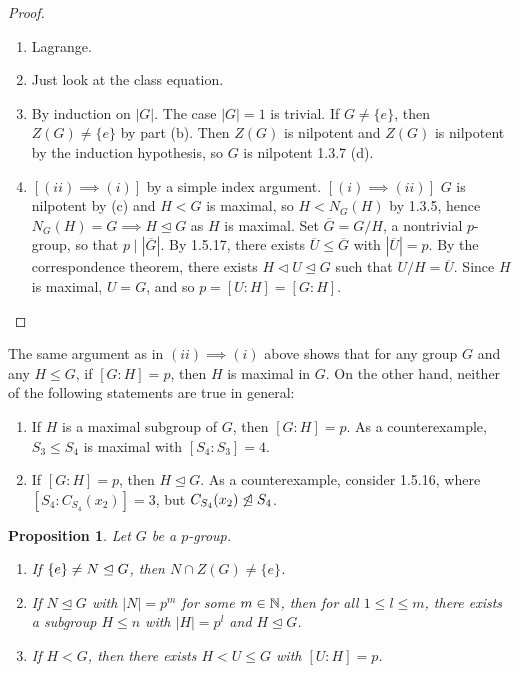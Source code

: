 \documentclass[11pt]{book}
\newcounter{counter}
\newtheorem{proposition}[counter]{Proposition}   \newtheorem{problem}[counter]{Problem}   \newtheorem*{proposition*}{Proposition}   \newtheorem*{lemma*}{Lemma}
\theoremstyle{definition}   \newtheorem{defn}[counter]{Definition} %
\newcommand{\ov}{\overline}   \newcommand{\wt}{\widetilde}
\newcommand{\nsg}{\mathrel{\unlhd}}   \newcommand{\ind}{\parindent24pt}   \newcommand{\vn}{\varnothing}
\newcommand{\tl}{\triangleleft}   \newcommand{\sd}[1]{\rtimes_{#1}}   \newcommand{\x}{^{\times}}   \newcommand{\cyc}[1]{\begin{pmatrix} #1 \end{pmatrix}}
\newcommand{\vs}{\vspace{8pt}}
\numberwithin{counter}{chapter}
\begin{document}
\begin{proof}
\
\begin{enumerate}
\item[(a)] Lagrange.
\item[(b)] Just look at the class equation.
\item[(c)] By induction on $|G|$. The case $|G| = 1$ is trivial. If $G \ne \{e\}$, then $Z(G) \ne \{e\}$ by part (b). Then $Z(G)$ is nilpotent and $Z(G)$ is nilpotent by the induction hypothesis, so $G$ is nilpotent 1.3.7 (d).
\item[(d)] $[(ii) \implies (i)]$ by a simple index argument. $[(i) \implies (ii)]$ $G$ is nilpotent by (c) and $H < G$ is maximal, so $H < N_G(H)$ by 1.3.5, hence $N_G(H) = G \implies H \nsg G$ as $H$ is maximal. Set $\ov{G} = G/H$, a nontrivial $p$-group, so that $p \mid |\ov{G}|$. By 1.5.17, there exists $\ov{U} \leq \ov{G}$ with $|\ov{U}| = p$. By the correspondence theorem, there exists $H \tl U \nsg G$ such that $U/H = \ov{U}$. Since $H$ is maximal, $U=G$, and so $p = [U : H] = [G : H]$.
\end{enumerate}
\end{proof}

\vs

\begin{remark}
The same argument as in $(ii) \implies (i)$ above shows that for any group $G$ and any $H \leq G$, if $[G : H] = p$, then $H$ is maximal in $G$. On the other hand, neither of the following statements are true in general:
	\begin{enumerate}
	\item[(i)] If $H$ is a maximal subgroup of $G$, then $[G : H] = p$. As a counterexample, $S_3 \leq S_4$ is maximal with $[S_4 : S_3] = 4$.
	\item[(ii)] If $[G : H] = p$, then $H\nsg G$. As a counterexample, consider 1.5.16, where $[S_4 : C_{S_4}(x_2)] = 3$, but $C_{S_4}(x_2) \not\nsg S_4$.
	\end{enumerate}
\end{remark}

\vs

\begin{proposition}
Let $G$ be a $p$-group.
	\begin{enumerate}
	\item[(a)] If $\triv \ne N \nsg G$, then $N \cap Z(G) \ne \{e\}$.
	\item[(b)] If $N \nsg G$ with $|N| = p^m$ for some $m \in \operatorname{\mathbb{N}}$, then for all $1 \leq l \leq m$, there exists a subgroup $H \leq n$ with $|H| = p^l$ and $H \nsg G$.
	\item[(c)] If $H < G$, then there exists $H < U \leq G$ with $[U : H] = p$.
	\end{enumerate}
\end{proposition}
\end{document}
